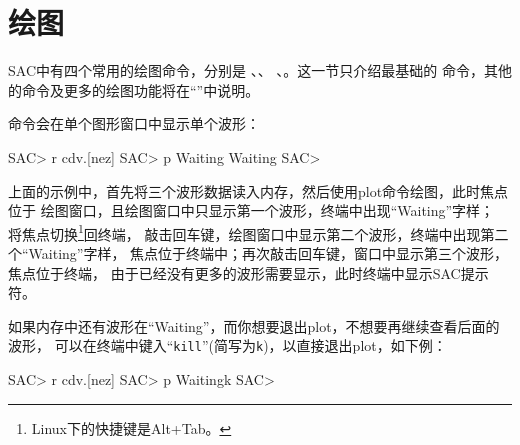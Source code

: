 \section{绘图}
\label{sec:display}

SAC中有四个常用的绘图命令，分别是 、、
、。这一节只介绍最基础的 
命令，其他的命令及更多的绘图功能将在``''中说明。

 命令会在单个图形窗口中显示单个波形：
\begin{SACCode}
SAC> r cdv.[nez]
SAC> p
Waiting
Waiting
SAC>
\end{SACCode}

上面的示例中，首先将三个波形数据读入内存，然后使用plot命令绘图，此时焦点位于
绘图窗口，且绘图窗口中只显示第一个波形，终端中出现``Waiting''字样；
将焦点切换\footnote{Linux下的快捷键是Alt+Tab。}回终端，
敲击回车键，绘图窗口中显示第二个波形，终端中出现第二个``Waiting''字样，
焦点位于终端中；再次敲击回车键，窗口中显示第三个波形，焦点位于终端，
由于已经没有更多的波形需要显示，此时终端中显示SAC提示符。

如果内存中还有波形在``Waiting''，而你想要退出plot，不想要再继续查看后面的波形，
可以在终端中键入``\texttt{kill}''(简写为\texttt{k})，以直接退出plot，如下例：
\begin{SACCode}
SAC> r cdv.[nez]
SAC> p
Waitingk
SAC>
\end{SACCode}
